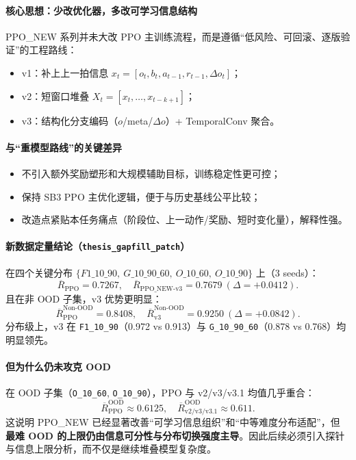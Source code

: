 ﻿\documentclass[11pt,a4paper]{ctexart}
\begin{document}
\paragraph{核心思想：少改优化器，多改可学习信息结构}
PPO\_NEW 系列并未大改 PPO 主训练流程，而是遵循“低风险、可回滚、逐版验证”的工程路线：
\begin{itemize}
  \item v1：补上上一拍信息 \(x_t=[o_t,b_t,a_{t-1},r_{t-1},\Delta o_t]\)；
  \item v2：短窗口堆叠 \(X_t=[x_t,\ldots,x_{t-k+1}]\)；
  \item v3：结构化分支编码（\(o\)/meta/\(\Delta o\)）+ TemporalConv 聚合。
\end{itemize}

\paragraph{与“重模型路线”的关键差异}
\begin{itemize}
  \item 不引入额外奖励塑形和大规模辅助目标，训练稳定性更可控；
  \item 保持 SB3 PPO 主优化逻辑，便于与历史基线公平比较；
  \item 改造点紧贴本任务痛点（阶段位、上一动作/奖励、短时变化量），解释性强。
\end{itemize}

\paragraph{新数据定量结论（\texttt{thesis\_gapfill\_patch}）}
在四个关键分布 \(\{F1\_10\_90,\ G\_10\_90\_60,\ O\_10\_60,\ O\_10\_90\}\) 上（3 seeds）：
\begin{equation}
\overline{R}_{\text{PPO}}=0.7267,\quad
\overline{R}_{\text{PPO\_NEW-v3}}=0.7679\ (\Delta=+0.0412).
\end{equation}
且在非 OOD 子集，v3 优势更明显：
\begin{equation}
\overline{R}^{\text{Non-OOD}}_{\text{PPO}}=0.8408,\quad
\overline{R}^{\text{Non-OOD}}_{\text{v3}}=0.9250\ (\Delta=+0.0842).
\end{equation}
分布级上，v3 在
\texttt{F1\_10\_90}（0.972 vs 0.913）与
\texttt{G\_10\_90\_60}（0.878 vs 0.768）均明显领先。

\paragraph{但为什么仍未攻克 OOD}
在 OOD 子集（\texttt{O\_10\_60}, \texttt{O\_10\_90}），PPO 与 v2/v3/v3.1 均值几乎重合：
\begin{equation}
\overline{R}^{\text{OOD}}_{\text{PPO}}\approx 0.6125,\quad
\overline{R}^{\text{OOD}}_{\text{v2/v3/v3.1}}\approx 0.611.
\end{equation}
这说明 PPO\_NEW 已经显著改善“可学习信息组织”和“中等难度分布适配”，但 \textbf{最难 OOD 的上限仍由信息可分性与分布切换强度主导}。因此后续必须引入探针与信息上限分析，而不仅是继续堆叠模型复杂度。
\end{document}
